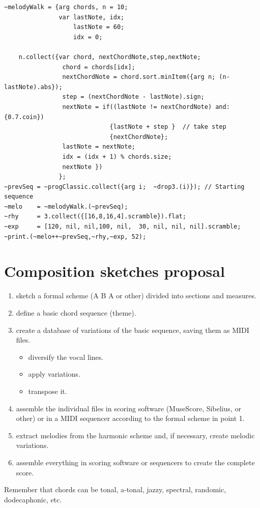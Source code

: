 \begin{lstlisting}[frame=single, caption=melodic-walk style model function] 
~melodyWalk = {arg chords, n = 10;
               var lastNote, idx;
                   lastNote = 60;
                   idx = 0;

    n.collect({var chord, nextChordNote,step,nextNote;
                chord = chords[idx];  
                nextChordNote = chord.sort.minItem({arg n; (n-lastNote).abs});
                step = (nextChordNote - lastNote).sign;
                nextNote = if((lastNote != nextChordNote) and: {0.7.coin}) 
                             {lastNote + step }  // take step
                             {nextChordNote};
                lastNote = nextNote;
                idx = (idx + 1) % chords.size;
                nextNote })
               };
~prevSeq = ~progClassic.collect({arg i;  ~drop3.(i)}); // Starting sequence
~melo    = ~melodyWalk.(~prevSeq);
~rhy     = 3.collect({[16,8,16,4].scramble}).flat;
~exp     = [120, nil, nil,100, nil,  30, nil, nil, nil].scramble;
~print.(~melo++~prevSeq,~rhy,~exp, 52);
\end{lstlisting}

\section{Composition sketches proposal}\label{composition-sketches-proposal}

\begin{enumerate}
\def\labelenumi{\arabic{enumi}.}
\tightlist
\item sketch a formal scheme  (A B A or other) divided into sections and measures.
\item define a basic chord sequence (theme).
\item create a database of variations of the basic sequence, saving them as MIDI files.
    \begin{itemize}
    \tightlist
    \item diversify the vocal lines.
    \item apply variations.
    \item transpose it.
    \end{itemize}
\item assemble the individual files in scoring software (MuseScore, Sibelius, or other) or in a MIDI sequencer according to the formal scheme in point 1.
\item extract melodies from the harmonic scheme and, if necessary, create melodic variations.
\item assemble everything in scoring software or sequencers to create the complete score.
\end{enumerate}

Remember that chords can be tonal, a-tonal, jazzy, spectral, randomic, dodecaphonic, etc.